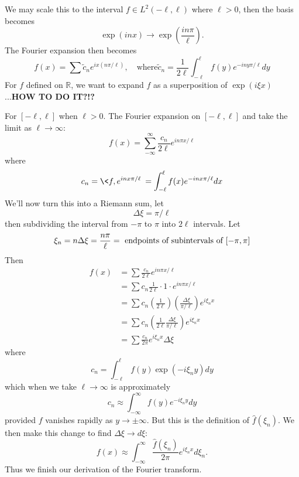 We may scale this to the interval $f\in L^{2}(-\ell,\ell)$
where $\ell>0$, then the basis becomes
\begin{equation}
\exp(inx)\to\exp\left(\frac{in\pi}{\ell}\right).
\end{equation}
The Fourier expansion then becomes
\begin{equation}
f(x) = \sum
\widetilde{c}_{n}e^{ix(n\pi/\ell)},\quad\text{where
}\widetilde{c}_n=\frac{1}{2\ell}\int^{\ell}_{-\ell}f(y)e^{-iny\pi/\ell}dy
\end{equation}
For $f$ defined on $\mathbb{R}$, we want to expand $f$ as a
superposition of $\exp(i\xi x)$...\textbf{HOW TO DO IT?!?}

For $[-\ell,\ell]$ when $\ell>0$. The Fourier expansion on
$[-\ell,\ell]$ and take the limit as $\ell\to\infty$:
\begin{equation}
f(x) = \sum^{\infty}_{-\infty}\frac{c_n}{2\ell}e^{in\pi
  x/\ell}
\end{equation}
where
\begin{equation}
c_n = \<f,e^{inx\pi/\ell}\> =
\int^{\ell}_{-\ell}f(x)e^{-inx\pi/\ell}dx
\end{equation}
We'll now turn this into a Riemann sum, let
\begin{equation}
\Delta\xi = \pi/\ell
\end{equation}
then subdividing the interval from $-\pi$ to $\pi$ into
$2\ell$ intervals. Let
\begin{equation}
\xi_n = n\Delta \xi = \frac{n\pi}{\ell} = \text{ endpoints of subintervals of }[-\pi,\pi]\index{$\xi_n$!As Dual To $x$}
\end{equation}
Then
\begin{subequations}
\begin{align}
f(x) &= \sum\frac{c_n}{2\ell}e^{in\pi x/\ell}\\
&=\sum c_n\frac{1}{2\ell}\cdot1\cdot e^{in\pi x/\ell}\\
&= \sum c_n\left(\frac{1}{2\ell}\right)\left(\frac{\Delta \xi}{\pi/\ell}\right)e^{i\xi_nx}\\
&= \sum c_n\left(\frac{1}{2\ell}\frac{\Delta \xi}{\pi/\ell}\right)e^{i\xi_nx}\\
&= \sum \frac{c_n}{2\pi}e^{i\xi_nx}\Delta \xi
\end{align}
\end{subequations}
where 
\begin{equation}
c_n = \int^{\ell}_{-\ell}f(y)\exp(-i\xi_{n}y)dy
\end{equation}
which when we take $\ell\to\infty$ is approximately
\begin{equation}
c_n\approx\int^{\infty}_{-\infty}f(y)e^{-i\xi_{n}y}dy
\end{equation}
provided $f$ vanishes rapidly as $y\to\pm\infty$. But this
is the definition of $\widehat{f}(\xi_n)$. We then make this
change to find $\Delta \xi\to d\xi$:
\begin{equation}
f(x)\approx \int^{\infty}_{-\infty}\frac{\widehat{f}(\xi_n)}{2\pi}e^{i\xi_nx}d\xi_n.
\end{equation}
Thus we finish our derivation of the Fourier transform.
